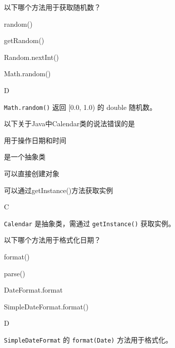 \begin{question}
	以下哪个方法用于获取随机数？
	\begin{options}
		\item random()
		\item getRandom()
		\item Random.nextInt()
		\item Math.random()
	\end{options}
	\begin{answer}
		D
	\end{answer}
	\begin{explanation}
		\texttt{Math.random()} 返回 [0.0, 1.0) 的 double 随机数。
	\end{explanation}
\end{question}

\begin{question}
	以下关于Java中Calendar类的说法错误的是
	\begin{options}
		\item 用于操作日期和时间
		\item 是一个抽象类
		\item 可以直接创建对象
		\item 可以通过getInstance()方法获取实例
	\end{options}
	\begin{answer}
		C
	\end{answer}
	\begin{explanation}
		\texttt{Calendar} 是抽象类，需通过 \texttt{getInstance()} 获取实例。
	\end{explanation}
\end{question}

\begin{question}
	以下哪个方法用于格式化日期？
	\begin{options}
		\item format()
		\item parse()
		\item DateFormat.format
		\item SimpleDateFormat.format()
	\end{options}
	\begin{answer}
		D
	\end{answer}
	\begin{explanation}
		\texttt{SimpleDateFormat} 的 \texttt{format(Date)} 方法用于格式化。
	\end{explanation}
\end{question}

